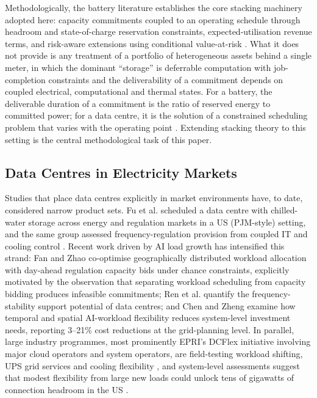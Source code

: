 \documentclass[lettersize,journal]{IEEEtran}
\begin{document}
Methodologically, the battery literature establishes the core stacking machinery adopted here: capacity commitments coupled to an operating schedule through headroom and state-of-charge reservation constraints, expected-utilisation revenue terms, and risk-aware extensions using conditional value-at-risk \cite{rockafellar2000optimization}. What it does not provide is any treatment of a portfolio of heterogeneous assets behind a single meter, in which the dominant ``storage'' is deferrable computation with job-completion constraints and the deliverability of a commitment depends on coupled electrical, computational and thermal states. For a battery, the deliverable duration of a commitment is the ratio of reserved energy to committed power; for a data centre, it is the solution of a constrained scheduling problem that varies with the operating point \cite{takci2026characterisation}. Extending stacking theory to this setting is the central methodological task of this paper.

\subsection{Data Centres in Electricity Markets}

Studies that place data centres explicitly in market environments have, to date, considered narrow product sets. Fu et al. \cite{fu2020multistage} scheduled a data centre with chilled-water storage across energy and regulation markets in a US (PJM-style) setting, and the same group assessed frequency-regulation provision from coupled IT and cooling control \cite{fu2020assessments}. Recent work driven by AI load growth has intensified this strand: Fan and Zhao \cite{fan2026harnessing} co-optimise geographically distributed workload allocation with day-ahead regulation capacity bids under chance constraints, explicitly motivated by the observation that separating workload scheduling from capacity bidding produces infeasible commitments; Ren et al. \cite{ren2025grid} quantify the frequency-stability support potential of data centres; and Chen and Zheng \cite{chen2026defer} examine how temporal and spatial AI-workload flexibility reduces system-level investment needs, reporting 3--21\% cost reductions at the grid-planning level. In parallel, large industry programmes, most prominently EPRI's DCFlex initiative involving major cloud operators and system operators, are field-testing workload shifting, UPS grid services and cooling flexibility \cite{epri2024dcflex}, and system-level assessments suggest that modest flexibility from large new loads could unlock tens of gigawatts of connection headroom in the US \cite{norris2025rethinking}.
\end{document}

